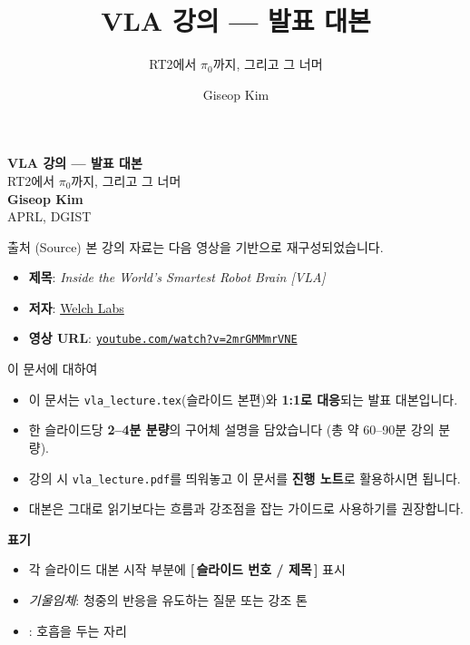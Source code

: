 \documentclass[aspectratio=169,10pt]{beamer}
\title{VLA 강의 --- 발표 대본}
\subtitle{RT2에서 $\pi_0$까지, 그리고 그 너머}
\author{Giseop Kim}
\institute{APRL, DGIST}
\date{}
\begin{document}
{
\begin{frame}[plain]
\vspace*{0.8cm}
\begin{center}
{\LARGE\textbf{VLA 강의 --- 발표 대본}}\\[0.3cm]
{\large RT2에서 $\pi_0$까지, 그리고 그 너머}\\[0.8cm]
\textbf{Giseop Kim}\\[0.15cm]
{\small APRL, DGIST}
\end{center}

\vspace{1.0cm}
\begin{block}{출처 (Source)}
본 강의 자료는 다음 영상을 기반으로 재구성되었습니다.
\begin{itemize}
  \footnotesize
  \item \textbf{제목}: \textit{Inside the World's Smartest Robot Brain [VLA]}
  \item \textbf{저자}: \href{https://www.youtube.com/@WelchLabs}{Welch Labs}
  \item \textbf{영상 URL}: \href{https://www.youtube.com/watch?v=2mrGMMmrVNE}{\texttt{youtube.com/watch?v=2mrGMMmrVNE}}
\end{itemize}
\end{block}
\end{frame}
}

\begin{frame}{이 문서에 대하여}
\begin{itemize}
  \item 이 문서는 \texttt{vla\_lecture.tex}(슬라이드 본편)와 \textbf{1:1로 대응}되는 발표 대본입니다.
  \item 한 슬라이드당 \textbf{2--4분 분량}의 구어체 설명을 담았습니다 (총 약 60--90분 강의 분량).
  \item 강의 시 \texttt{vla\_lecture.pdf}를 띄워놓고 이 문서를 \textbf{진행 노트}로 활용하시면 됩니다.
  \item 대본은 그대로 읽기보다는 \alert{흐름과 강조점을 잡는 가이드}로 사용하기를 권장합니다.
\end{itemize}

\vspace{1em}
\textbf{표기}
\begin{itemize}
  \item 각 슬라이드 대본 시작 부분에 \textbf{[\,슬라이드 번호 / 제목\,]} 표시
  \item \textit{기울임체}: 청중의 반응을 유도하는 질문 또는 강조 톤
  \item [말줄임]: 호흡을 두는 자리
\end{itemize}
\end{frame}
\end{document}
